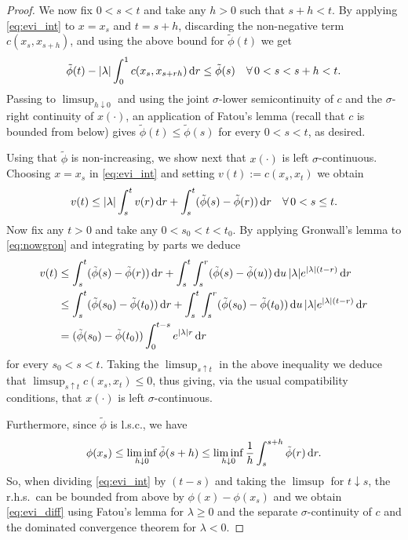 \documentclass[reqno]{amsart}
\theoremstyle{plain}
\theoremstyle{remark}
\theoremstyle{plain}
\numberwithin{equation}{section}
\theoremstyle{remark}
\newcommand{\de}{{\,\rm d}}
\begin{document}
\begin{proof}
 We now fix $0<s<t$ and  take any $h>0$ such that $s+h<t$.  By applying  \eqref{eq:evi_int} to $x=x_s$  and $t=s+h$,  discarding  the non-negative term $c(x_s,x_{s+h})$, and  using the above   bound  for $\tilde{\phi}(t)$  we  get 
\begin{equation*}
    \tilde{\phi}(t) - |\lambda| \int_0^1 c(x_s,x_{s+rh})\de r \le \tilde \phi(s) \quad \forall \,  0<s<s+h<t .
\end{equation*}
 Passing to $\limsup_{h \downarrow 0}$  and using the  joint   $\sigma$-lower semicontinuity of $c$ and the $\sigma$-right continuity of $x(\cdot)$, an application of Fatou's lemma (recall  that  $c$ is bounded from below) gives $\tilde \phi(t) \le \tilde \phi (s)$ for every $0 < s< t$, as desired.

 Using that $\tilde{\phi}$ is non-increasing, we show next that $x(\cdot)$ is left  $\sigma$-continuous.  Choosing  $x=x_s$ in  \eqref{eq:evi_int}  and setting   $v(t):=c(x_s,x_t)$ we obtain
\begin{equation}\label{eq:nowgron}
    v(t) \le |\lambda| \int_s^t v(r) \de r + \int_s^t (\tilde{\phi}(s)-\tilde{\phi}(r)) \de r \quad \forall \, 0< s \le t.
\end{equation}
Now fix any $t>0$ and take any $0<s_0<t<t_0$.  By applying Gronwall's lemma to \eqref{eq:nowgron} and integrating by parts we deduce 
\begin{align*}
v(t) &\le \int_s^t (\tilde{\phi}(s)-\tilde{\phi}(r))\de r + \int_s^t \int_s^r(\tilde{\phi}(s)-\tilde{\phi}(u))\de u \,|\lambda | e^{|\lambda|(t-r)} \de r \\
& \le \int_s^t (\tilde{\phi}(s_0)-\tilde{\phi}(t_0))\de r + \int_s^t \int_s^r(\tilde{\phi}(s_0)-\tilde{\phi}(t_0))\de u \,|\lambda | e^{|\lambda| (t-r)} \de r \\
& = (\tilde{\phi}(s_0)-\tilde{\phi}(t_0))\int_0^{t-s} e^{|\lambda| r} \de r 
\end{align*}
for every $s_0<s<t$.  Taking the $\limsup_{s \uparrow t}$ in  the above inequality we deduce that $\limsup_{s \uparrow t} c(x_s,x_t)\le 0$, thus giving, via the usual compatibility conditions, that $x(\cdot)$ is left $\sigma$-continuous.


Furthermore, since $\tilde \phi$ is l.s.c., we have 
\begin{equation}\label{eq:phi_lsc_proof}
    \phi(x_s) \le \liminf_{h\downarrow 0} \tilde \phi(s+h)\le \liminf_{h\downarrow 0} \frac{1}{h} \int_s^{s+h}  \tilde \phi(r) \de r.
\end{equation}
So, when dividing \eqref{eq:evi_int} by $(t-s)$ and taking the $\limsup$ for $t\downarrow s$, the r.h.s.\ can be bounded from above by $\phi(x)-\phi(x_s)$ and we obtain \eqref{eq:evi_diff} using Fatou's lemma for $\lambda \ge 0$ and the   separate   $\sigma$-continuity of $c$ and  the dominated convergence theorem for $\lambda<0$. 


\end{proof}
\end{document}
